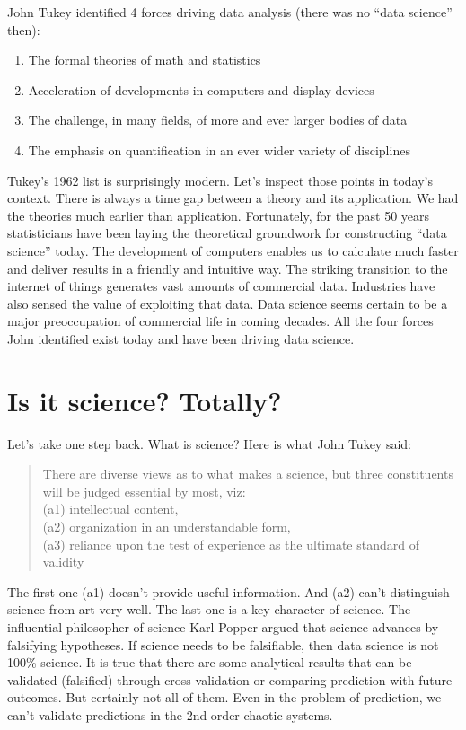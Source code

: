 \documentclass[]{book}
\providecommand{\tightlist}{%
  \setlength{\itemsep}{0pt}\setlength{\parskip}{0pt}}
\theoremstyle{definition}
\theoremstyle{definition}
\theoremstyle{remark}
\begin{document}
John Tukey identified 4 forces driving data analysis (there was no
``data science'' then):

\begin{enumerate}
\def\labelenumi{\arabic{enumi}.}
\tightlist
\item
  The formal theories of math and statistics
\item
  Acceleration of developments in computers and display devices
\item
  The challenge, in many fields, of more and ever larger bodies of data
\item
  The emphasis on quantification in an ever wider variety of disciplines
\end{enumerate}

Tukey's 1962 list is surprisingly modern. Let's inspect those points in
today's context. There is always a time gap between a theory and its
application. We had the theories much earlier than application.
Fortunately, for the past 50 years statisticians have been laying the
theoretical groundwork for constructing ``data science'' today. The
development of computers enables us to calculate much faster and deliver
results in a friendly and intuitive way. The striking transition to the
internet of things generates vast amounts of commercial data. Industries
have also sensed the value of exploiting that data. Data science seems
certain to be a major preoccupation of commercial life in coming
decades. All the four forces John identified exist today and have been
driving data science.

\section{Is it science? Totally?}\label{is-it-science-totally}

Let's take one step back. What is science? Here is what John Tukey said:

\begin{quote}
There are diverse views as to what makes a science, but three
constituents will be judged essential by most, viz:\\
(a1) intellectual content,\\
(a2) organization in an understandable form,\\
(a3) reliance upon the test of experience as the ultimate standard of
validity
\end{quote}

The first one (a1) doesn't provide useful information. And (a2) can't
distinguish science from art very well. The last one is a key character
of science. The influential philosopher of science Karl Popper argued
that science advances by falsifying hypotheses. If science needs to be
falsifiable, then data science is not 100\% science. It is true that
there are some analytical results that can be validated (falsified)
through cross validation or comparing prediction with future outcomes.
But certainly not all of them. Even in the problem of prediction, we
can't validate predictions in the 2nd order chaotic systems.
\end{document}
